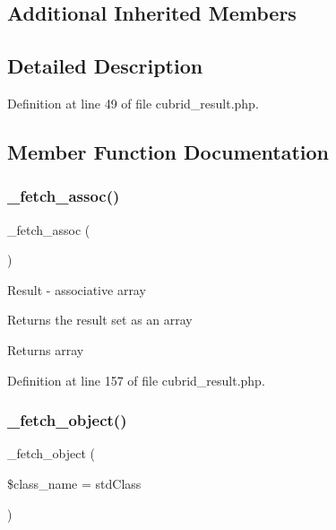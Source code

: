 \subsection*{Additional Inherited Members}


\subsection{Detailed Description}


Definition at line 49 of file cubrid\+\_\+result.\+php.



\subsection{Member Function Documentation}
\mbox{\label{class_c_i___d_b__cubrid__result_a43a9a92817f1334a1c10752ec44275a0}} 
\subsubsection{\texorpdfstring{\_fetch\_assoc()}{\_fetch\_assoc()}}
{\footnotesize\ttfamily \+\_\+fetch\+\_\+assoc (\begin{DoxyParamCaption}{ }\end{DoxyParamCaption})\hspace{0.3cm}{\ttfamily [protected]}}

Result -\/ associative array

Returns the result set as an array

\begin{DoxyReturn}{Returns}
array 
\end{DoxyReturn}


Definition at line 157 of file cubrid\+\_\+result.\+php.

\mbox{\label{class_c_i___d_b__cubrid__result_a60806be6a9c2488820813c2a7f4fef71}} 
\subsubsection{\texorpdfstring{\_fetch\_object()}{\_fetch\_object()}}
{\footnotesize\ttfamily \+\_\+fetch\+\_\+object (\begin{DoxyParamCaption}\item[{}]{\$class\+\_\+name = {\ttfamily \textquotesingle{}stdClass\textquotesingle{}} }\end{DoxyParamCaption})\hspace{0.3cm}{\ttfamily [protected]}}


